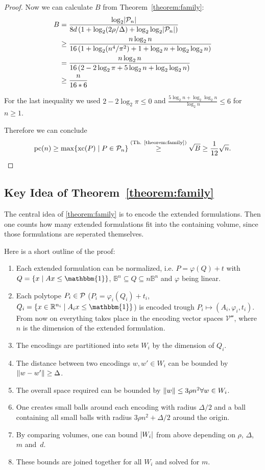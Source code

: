 \begin{proof}
  Now we can calculate $B$ from Theorem~\ref{theorem:family}:
  \begin{align*}
    B &= \frac{\log_2 \abs{\P_n}}{8d \left(1 + \log_2 (2\rho/\Delta) + \log_2\log_2 \abs{\P_n} \right)}\\
    &\geq \frac{n \log_2 n}{16 \left(1 + \log_2 (n^4 / \pi^2) + 1 + \log_2 n + \log_2 \log_2 n \right)}\\
    &= \frac{n \log_2 n}{16 \left(2 - 2 \log_2 \pi + 5 \log_2 n + \log_2 \log_2 n \right)}\\
    &\geq \frac{n}{16*6}
  \end{align*}

  For the last inequality we used $2 - 2 \log_2 \pi \leq 0$ and $\frac{5 \log_2 n + \log_2 \log_2 n}{\log_2 n} \leq 6$ for $n \geq 1$.

  Therefore we can conclude $$\pc(n) \geq \max \{\xc(P) \mid P \in \P_n\} \stackrel{\text{(Th. \ref{theorem:family})}}{\geq} \sqrt{B} \geq \frac{1}{12} \sqrt{n} .$$
\end{proof}



\subsection{Key Idea of Theorem~\ref{theorem:family}}

The central idea of \ref{theorem:family} is to encode the extended formulations. Then one counts how many extended formulations fit into the containing volume, since those formulations are seperated themselves.

Here is a short outline of the proof:
\begin{enumerate}
  \item Each extended formulation can be normalized, i.e. $P = \varphi(Q) + t$ with $Q = \{ x \mid Ax \leq \mathbbm{1} \}$, $\mathbb{B}^n \subseteq Q \subseteq n\mathbb{B}^n$ and $\varphi$ being linear.
  \item Each polytope $P_i \in \P$ ($P_i = \varphi_i(Q_i) + t_i$, $Q_i = \{ x \in \R^{n_i} \mid A_ix \leq \mathbbm{1} \}$) is encoded trough $P_i \mapsto (A_i, \varphi_i, t_i)$.\\
  From now on everything takes place in the encoding vector spaces $\mathcal{V^n}$, where $n$ is the dimension of the extended formulation.
  \item The encodings are partitioned into sets $W_i$ by the dimension of $Q_i$.
  \item The distance between two encodings $w, w' \in W_i$ can be bounded by $\norm{w - w'} \geq \Delta$.
  \item The overall space required can be bounded by $\norm{w} \leq 3\rho n^2 \forall w \in W_i$.
  \item One creates small balls around each encoding with radius $\Delta/2$ and a ball containing all small balls with radius $3\rho n^2 + \Delta/2$ around the origin.
  \item By comparing volumes, one can bound $\abs{W_i}$ from above depending on $\rho$, $\Delta$, $m$ and~$d$.
  \item These bounds are joined together for all $W_i$ and solved for $m$.
\end{enumerate}

